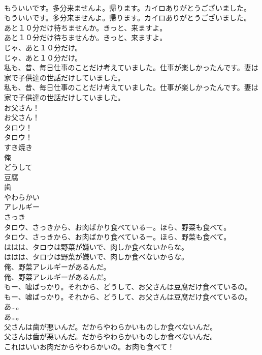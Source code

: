 \documentclass[8pt]{extreport}
\begin{document}
\begin{CJK}{UTF8}{min}
\\	もういいです。多分来ませんよ。帰ります。カイロありがとうございました。	
\\	もういいです。多分来ませんよ。帰ります。カイロありがとうございました。 
\\	あと１０分だけ待ちませんか。きっと、来ますよ。	
\\	あと１０分だけ待ちませんか。きっと、来ますよ。 
\\	じゃ、あと１０分だけ。	
\\	じゃ、あと１０分だけ。 
\\	私も、昔、毎日仕事のことだけ考えていました。仕事が楽しかったんです。妻は家で子供達の世話だけしていました。	
\\	私も、昔、毎日仕事のことだけ考えていました。仕事が楽しかったんです。妻は家で子供達の世話だけしていました。 
\\	お父さん！	
\\	お父さん！ 
\\	タロウ！	
\\	タロウ！ 
\\	すき焼き
\\	俺
\\	どうして
\\	豆腐
\\	歯
\\	やわらかい
\\	アレルギー
\\	さっき
\\	タロウ、さっきから、お肉ばかり食べているー。ほら、野菜も食べて。	
\\	タロウ、さっきから、お肉ばかり食べているー。ほら、野菜も食べて。 
\\	ははは、タロウは野菜が嫌いで、肉しか食べないからな。	
\\	ははは、タロウは野菜が嫌いで、肉しか食べないからな。 
\\	俺、野菜アレルギーがあるんだ。	
\\	俺、野菜アレルギーがあるんだ。 
\\	もー、嘘ばっかり。それから、どうして、お父さんは豆腐だけ食べているの。	
\\	もー、嘘ばっかり。それから、どうして、お父さんは豆腐だけ食べているの。 
\\	あ…。	
\\	あ…。 
\\	父さんは歯が悪いんだ。だからやわらかいものしか食べないんだ。	
\\	父さんは歯が悪いんだ。だからやわらかいものしか食べないんだ。 
\\	これはいいお肉だからやわらかいの。お肉も食べて！	

\end{CJK}
\end{document}
